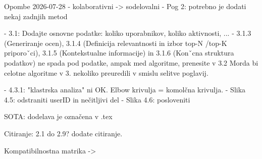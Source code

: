 Opombe
2026-07-28
 - kolaborativni -> sodelovalni
 - Pog 2: potrebno je dodati nekaj zadnjih metod

 - 3.1: Dodajte osnovne podatke: koliko uporabnikov, koliko aktivnosti, ...
 - 3.1.3 (Generiranje ocen), 3.1.4 (Definicija relevantnosti in izbor top-N /top-K priporoˇci), 3.1.5 (Kontekstualne informacije) in 3.1.6 (Konˇcna struktura podatkov) ne spada pod podatke, ampak med algoritme, prenesite v 3.2
 Morda bi celotne algoritme v 3. nekoliko preuredili v smislu selitve poglavij.

- 4.3.1: "klastrska analiza" ni OK. Elbow krivulja = komolčna krivulja.
- Slika 4.5: odstraniti userID in nečitljivi del
- Slika 4.6: posloveniti



SOTA: dodelava je označena v .tex

Citiranje: 2.1 do 2.9? dodate citiranje. 

Kompatibilnostna matrika -> 

